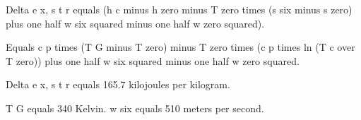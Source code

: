Delta e x, s t r equals (h c minus h zero minus T zero times (s six minus s zero) plus one half w six squared minus one half w zero squared).

Equals c p times (T G minus T zero) minus T zero times (c p times ln (T c over T zero)) plus one half w six squared minus one half w zero squared.

Delta e x, s t r equals 165.7 kilojoules per kilogram.

T G equals 340 Kelvin.
w six equals 510 meters per second.